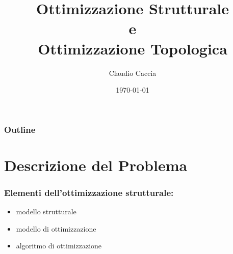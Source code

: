 \documentclass{beamer}
\title[Structural Optimization]{Ottimizzazione Strutturale \\
	e \\
	Ottimizzazione Topologica } %
\author{Claudio Caccia} %
\institute[Polimi] %
{
Progetto di Strutture Aerospaziali \\ %
\medskip
\textit{Politecnico di Milano} %
}
\date{\today} %
\begin{document}
\begin{frame}
\titlepage %
\end{frame}

\begin{frame}
\frametitle{Outline} %
\tableofcontents
\end{frame}


\section{Descrizione del Problema} %


\begin{frame}
	\frametitle{Elementi dell'ottimizzazione strutturale:}
	\begin{itemize}
		\item modello strutturale
		\item modello di ottimizzazione
		\item algoritmo di ottimizzazione
	\end{itemize}
\end{frame}
\end{document}

